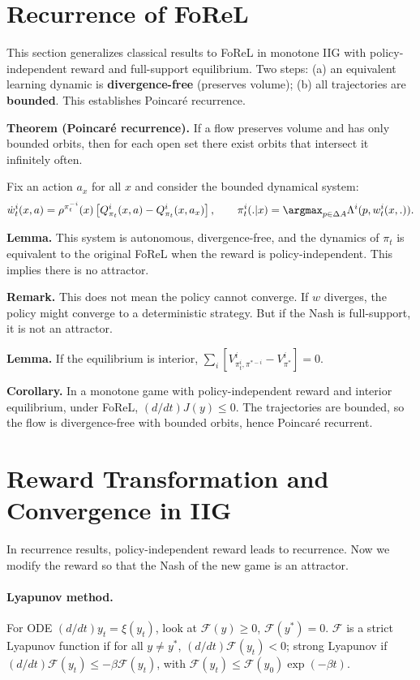 \section{Recurrence of FoReL}
This section generalizes classical results to FoReL in monotone IIG with policy-independent reward and full-support equilibrium. Two steps: (a) an equivalent learning dynamic is \textbf{divergence-free} (preserves volume); (b) all trajectories are \textbf{bounded}. This establishes Poincar\'e recurrence.

\textbf{Theorem (Poincar\'e recurrence).} If a flow preserves volume and has only bounded orbits, then for each open set there exist orbits that intersect it infinitely often.

Fix an action $a_x$ for all $x$ and consider the bounded dynamical system:
$$\dot w_t^i(x, a) = \rho^{\pi_t^{-i}}(x)\left[Q^i_{\pi_t}(x, a) - Q^i_{\pi_t}(x, a_x)\right],\qquad \pi^i_t(.|x)=\argmax_{p \in \Delta A} \Lambda^i(p, w_t^i(x,.)).$$

\textbf{Lemma.} This system is autonomous, divergence-free, and the dynamics of $\pi_t$ is equivalent to the original FoReL when the reward is policy-independent. This implies there is no attractor.

\textbf{Remark.} This does not mean the policy cannot converge. If $w$ diverges, the policy might converge to a deterministic strategy. But if the Nash is full-support, it is not an attractor.

\textbf{Lemma.} If the equilibrium is interior, $\sum_i [V^i_{\pi^i_t, \pi^{*-i}} - V^i_{\pi^*}] = 0$.

\textbf{Corollary.} In a monotone game with policy-independent reward and interior equilibrium, under FoReL, $(d/dt)J(y) \leq 0$. The trajectories are bounded, so the flow is divergence-free with bounded orbits, hence Poincar\'e recurrent.

\section{Reward Transformation and Convergence in IIG}
In recurrence results, policy-independent reward leads to recurrence. Now we modify the reward so that the Nash of the new game is an attractor.

\paragraph{Lyapunov method.}
For ODE $(d/dt)y_t = \xi(y_t)$, look at $\mathcal{F}(y)\geq 0$, $\mathcal{F}(y^*)=0$. $\mathcal{F}$ is a strict Lyapunov function if for all $y \neq y^*$, $(d/dt)\mathcal{F}(y_t) < 0$; strong Lyapunov if $(d/dt)\mathcal{F}(y_t) \leq -\beta \mathcal{F}(y_t)$, with $\mathcal{F}(y_t) \leq \mathcal{F}(y_0) \exp(-\beta t)$.

